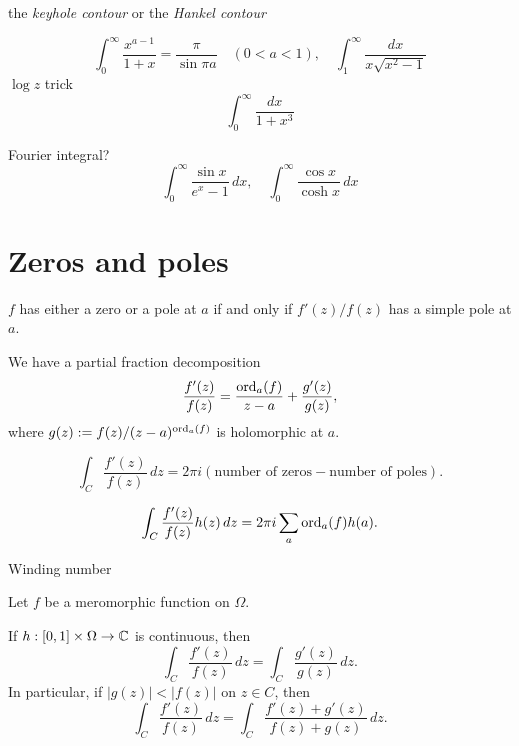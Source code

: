 \documentclass{../note}
\begin{document}
\begin{prb}
the \emph{keyhole contour} or the \emph{Hankel contour}

\[\int_0^\infty\frac{x^{a-1}}{1+x}=\frac\pi{\sin\pi a}\quad(0<a<1),\quad\int_1^\infty\frac{dx}{x\sqrt{x^2-1}}\]
$\log z$ trick
\[\int_0^\infty\frac{dx}{1+x^3}\]
\end{prb}

\begin{prb}
Fourier integral?
\[\int_0^\infty\frac{\sin x}{e^x-1}\,dx,\quad\int_0^\infty\frac{\cos x}{\cosh x}\,dx\]
\end{prb}







\section{Zeros and poles}
\begin{prb}
\begin{parts}
\item $f$ has either a zero or a pole at $a$ if and only if $f'(z)/f(z)$ has a simple pole at $a$. 
\item We have a partial fraction decomposition
\[\frac{f'(z)}{f(z)}=\frac{\operatorname{ord}_a(f)}{z-a}+\frac{g'(z)}{g(z)},\]
where $g(z):=f(z)/(z-a)^{\operatorname{ord}_a(f)}$ is holomorphic at $a$.
\item
\[\int_C\frac{f'(z)}{f(z)}\,dz=2\pi i(\text{number of zeros}-\text{number of poles}).\]
\item
\[\int_C\frac{f'(z)}{f(z)}h(z)\,dz=2\pi i\sum_a\operatorname{ord}_a(f)h(a).\]
\item Winding number
\end{parts}
\end{prb}


\begin{prb}
Let $f$ be a meromorphic function on $\Omega$.
\begin{parts}
\item
If $h:[0,1]\times\Omega\to\mathbb{C}$ is continuous, then 
\[\int_C\frac{f'(z)}{f(z)}\,dz=\int_C\frac{g'(z)}{g(z)}\,dz.\]
In particular, if $|g(z)|<|f(z)|$ on $z\in C$, then
\[\int_C\frac{f'(z)}{f(z)}\,dz=\int_C\frac{f'(z)+g'(z)}{f(z)+g(z)}\,dz.\]
\end{parts}
\end{prb}
\end{document}
